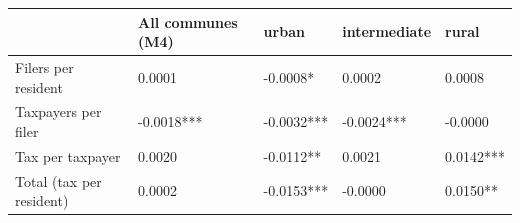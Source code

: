 \begin{tabular}{lllll}
\toprule
 & All communes (M4) & urban & intermediate & rural \\
\midrule
Filers per resident & 0.0001 & -0.0008* & 0.0002 & 0.0008 \\
Taxpayers per filer & -0.0018*** & -0.0032*** & -0.0024*** & -0.0000 \\
Tax per taxpayer & 0.0020 & -0.0112** & 0.0021 & 0.0142*** \\
Total (tax per resident) & 0.0002 & -0.0153*** & -0.0000 & 0.0150** \\
\bottomrule
\end{tabular}
